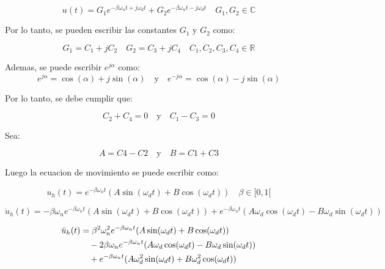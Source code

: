 \documentclass{article}  %
\begin{document}
\begin{equation}
    u(t) = G_1 e^{-\beta \omega_n t + j \omega_d t} + G_2 e^{-\beta \omega_n t - j \omega_d t} \quad G_1, G_2 \in \mathbb{C}
\end{equation}

Por lo tanto, se pueden escribir las constantes $G_1$ y $G_2$ como:

\begin{equation}
    G_1 = C_1 + jC_2 \quad G_2 = C_3 + jC_4 \quad C_1, C_2, C_3, C_4 \in \mathbb{R}
\end{equation}

Ademas, se puede escribir $e^{j\alpha}$ como:
\begin{equation}
    e^{j\alpha} = \cos(\alpha) + j\sin(\alpha) \quad \text{y} \quad e^{-j\alpha} = \cos(\alpha) - j\sin(\alpha)
\end{equation}

Por lo tanto, se debe cumplir que:

\begin{equation}
    C_2 + C_4 = 0 \quad \text{y} \quad C_1 - C_3 = 0
\end{equation}

Sea:

\begin{equation}
    A = C4 - C2 \quad \text{y} \quad B = C1 + C3
\end{equation}

Luego la ecuacion de movimiento se puede escribir como:

\begin{equation}
    u_h(t) = e^{-\beta \omega_n t} (A \sin(\omega_d t) + B \cos(\omega_d t)) \quad \beta \in [0, 1[
\end{equation}

\begin{equation}
    \dot{u}_h(t) = -\beta \omega_n e^{-\beta \omega_n t} (A \sin(\omega_d t) + B \cos(\omega_d t)) + e^{-\beta \omega_n t} (A \omega_d \cos(\omega_d t) - B \omega_d \sin(\omega_d t))
\end{equation}

\begin{align}
    \ddot{u}_h(t) &= \beta^2 \omega_n^2 e^{-\beta \omega_n t} (A \sin(\omega_d t) + B \cos(\omega_d t)) \notag \\
    &\quad - 2\beta \omega_n e^{-\beta \omega_n t} (A \omega_d \cos(\omega_d t) - B \omega_d \sin(\omega_d t)) \notag \\
    &\quad + e^{-\beta \omega_n t} (A \omega_d^2 \sin(\omega_d t) + B \omega_d^2 \cos(\omega_d t))
\end{align}
    
\end{document}

